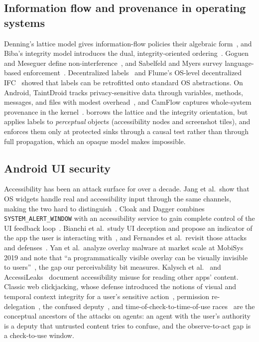 \subsection{Information flow and provenance in operating systems}\label{sec:rw-ifc}

Denning's lattice model gives information-flow policies their algebraic form~\cite{denning1976lattice}, and Biba's integrity model introduces the dual, integrity-oriented ordering~\cite{biba1977integrity}. Goguen and Meseguer define non-interference~\cite{goguen1982noninterference}, and Sabelfeld and Myers survey language-based enforcement~\cite{sabelfeld2003language}. Decentralized labels~\cite{myers1997decentralized} and Flume's OS-level decentralized IFC~\cite{krohn2007flume} showed that labels can be retrofitted onto standard OS abstractions. On Android, TaintDroid tracks privacy-sensitive data through variables, methods, messages, and files with modest overhead~\cite{enck2010taintdroid}, and CamFlow captures whole-system provenance in the kernel~\cite{pasquier2017camflow}. \PG{} borrows the lattice and the integrity orientation, but applies labels to \emph{perceptual} objects (accessibility nodes and screenshot tiles), and enforces them only at protected sinks through a causal test rather than through full propagation, which an opaque model makes impossible.

\subsection{Android UI security}\label{sec:rw-ui}

Accessibility has been an attack surface for over a decade. Jang et al.\ show that OS widgets handle real and accessibility input through the same channels, making the two hard to distinguish~\cite{jang2014a11y}. Cloak and Dagger combines \texttt{SYSTEM\_ALERT\_WINDOW} with an accessibility service to gain complete control of the UI feedback loop~\cite{fratantonio2017cloak}. Bianchi et al.\ study UI deception and propose an indicator of the app the user is interacting with~\cite{bianchi2015whattheapp}, and Fernandes et al.\ revisit those attacks and defenses~\cite{fernandes2016uideception}. Yan et al.\ analyze overlay malware at market scale at MobiSys 2019 and note that ``a programmatically visible overlay can be visually invisible to users''~\cite{yan2019overlay}, the gap our perceivability bit measures. Kalysch et al.~\cite{kalysch2018a11y} and AccessiLeaks~\cite{naseri2019accessileaks} document accessibility misuse for reading other apps' content. Classic web clickjacking, whose defense introduced the notions of visual and temporal context integrity for a user's sensitive action~\cite{huang2012clickjacking}, permission re-delegation~\cite{felt2011redelegation}, the confused deputy~\cite{hardy1988confused}, and time-of-check-to-time-of-use races~\cite{bishop1996toctou} are the conceptual ancestors of the attacks on agents: an agent with the user's authority is a deputy that untrusted content tries to confuse, and the observe-to-act gap is a check-to-use window.

